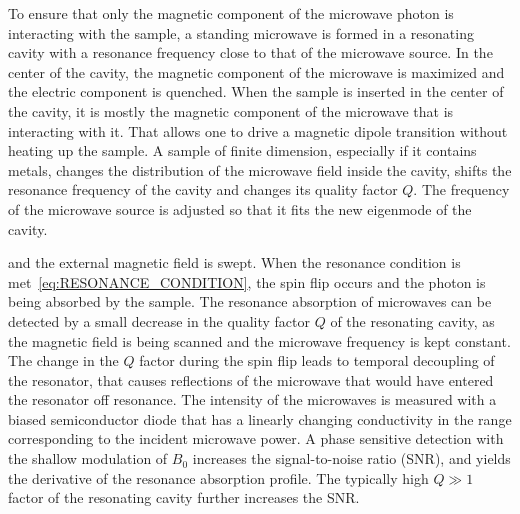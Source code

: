 \par
To ensure that only the magnetic component of the microwave photon is interacting with the sample, a standing microwave is formed in a resonating cavity with a resonance frequency close to that of the microwave source. In the center of the cavity, the magnetic component of the microwave is maximized and the electric component is quenched. When the sample is inserted in the center of the cavity, it is mostly the magnetic component of the microwave that is interacting with it. That allows one to drive a magnetic dipole transition without heating up the sample. A sample of finite dimension, especially if it contains metals, changes the distribution of the microwave field inside the cavity, shifts the resonance frequency of the cavity and changes its quality factor $Q$. The frequency of the microwave source is adjusted so that it fits the new eigenmode of the cavity. 




and the external magnetic field is swept. When the resonance condition is met~\ref{eq:RESONANCE_CONDITION}, the spin flip occurs and the photon is being absorbed by the sample. The resonance absorption of microwaves can be detected by a small decrease in the quality factor $Q$ of the resonating cavity, as the magnetic field is being scanned and the microwave frequency is kept constant. The change in the $Q$ factor during the spin flip leads to temporal decoupling of the resonator, that causes reflections of the microwave that would have entered the resonator off resonance. The intensity of the microwaves is measured with a biased semiconductor diode that has a linearly changing conductivity in the range corresponding to  the incident microwave power. A phase sensitive detection with the shallow modulation of $B_0$ increases the signal-to-noise ratio (SNR), and yields the derivative of the resonance absorption profile. The typically high $Q\gg1$ factor of the resonating cavity further increases the SNR.


